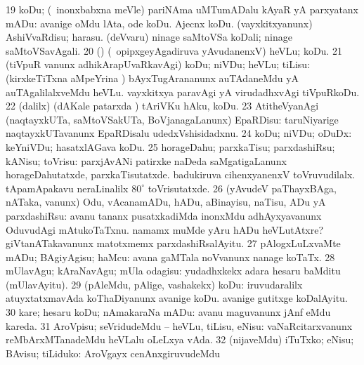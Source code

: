 {{\num{19} koDu; (\kanmu\ inonxbabxna meVle) pariNAma uMTumADalu kAyaR
yA parxyatanx mADu:  avanige oMdu lAta, ode
koDu.  Ajecnx koDu. 
(vayxkitxyanunx) AshiVvaRdisu; harasu.  (deVvaru) ninage saMtoVSa koDali;
ninage saMtoVSavAgali. 
\num{20} (\AmA) (\kanmu\ opipxgeyAgadiruva yAvudanenxV)
heVLu; koDu. 
\num{21} (tiVpuR \mo vanunx adhikArapUvaRkavAgi) koDu; niVDu;
heVLu; tiLisu:  (kirxkeTiTxna aMpeYrina \vi) bAyxTugArananunx auTAdaneMdu yA auTAgalilalxveMdu heVLu.  vayxkitxya paravAgi yA virudadhxvAgi tiVpuRkoDu. 
\num{22} (\BUkaq dalilx) (dAKale patarxda \vi) tAriVKu hAku, koDu. 
\num{23} AtitheVyanAgi (naqtayxkUTa, saMtoVSakUTa, BoVjanagaLanunx) EpaRDisu:  taruNiyarige naqtayxkUTavanunx EpaRDisalu 
udedxVshisidadxnu. 
\num{24} koDu; niVDu; oDuDx: 
keYniVDu; hasatxlAGava koDu. 
\num{25} horageDahu; parxkaTisu; parxdashiRsu; kANisu; toVrisu:
 parxjAvANi patirxke naDeda
saMgatigaLanunx horageDahutatxde, parxkaTisutatxde.  badukiruva cihenxyanenxV toVruvudilalx.  tApamApakavu
neraLinalilx $80^\circ$ toVrisutatxde. 
\num{26} (yAvudeV paThayxBAga, nATaka, \mo vanunx) Odu, vAcanamADu, hADu, aBinayisu, naTisu, ADu yA parxdashiRsu:
 avanu tananx pusatxkadiMda inonxMdu adhAyxyavanunx OduvudAgi mAtukoTaTxnu.  namamx muMde yAru hADu heVLutAtxre? 
giVtanATakavanunx matotxmemx parxdashiRsalAyitu. 
\num{27} pAlogxLuLxvaMte mADu; BAgiyAgisu; haMcu:  avana gaMTala noVvanunx
nanage koTaTx. 
\num{28} mUlavAgu; kAraNavAgu; mUla odagisu:  yudadhxkekx adara hesaru baMditu (mUlavAyitu). 
\num{29} (pAleMdu, pAlige, vashakekx) koDu:  iruvudaralilx atuyxtatxmavAda koThaDiyanunx avanige
koDu.  avanige gutitxge koDalAyitu. 
\num{30} kare; hesaru koDu; nAmakaraNa mADu:
 avanu maguvanunx jAnf eMdu kareda.
\num{31} AroVpisu; seVridudeMdu -- heVLu, tiLisu, eNisu:  vaNaRcitarxvanunx
reMbArxMTanadeMdu heVLalu oLeLxya vAda. 
\num{32} (nijaveMdu) iTuTxko; eNisu; BAvisu; tiLiduko:
 AroVgayx cenAnxgiruvudeMdu
}}
